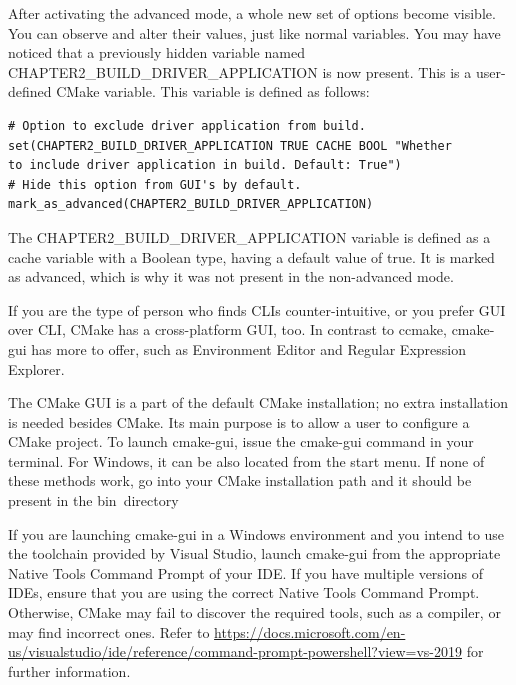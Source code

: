 After activating the advanced mode, a whole new set of options become visible. You can observe and alter their values, just like normal variables. You may have noticed that a previously hidden variable named CHAPTER2\_BUILD\_DRIVER\_APPLICATION is now present. This is a user-defined CMake variable. This variable is defined as follows:

\begin{lstlisting}[style=styleCMake]
# Option to exclude driver application from build.
set(CHAPTER2_BUILD_DRIVER_APPLICATION TRUE CACHE BOOL "Whether
to include driver application in build. Default: True")
# Hide this option from GUI's by default.
mark_as_advanced(CHAPTER2_BUILD_DRIVER_APPLICATION)
\end{lstlisting}

The CHAPTER2\_BUILD\_DRIVER\_APPLICATION variable is defined as a cache variable with a Boolean type, having a default value of true. It is marked as advanced, which is why it was not present in the non-advanced mode.


If you are the type of person who finds CLIs counter-intuitive, or you prefer GUI over CLI, CMake has a cross-platform GUI, too. In contrast to ccmake, cmake-gui has more to offer, such as Environment Editor and Regular Expression Explorer.

The CMake GUI is a part of the default CMake installation; no extra installation is needed besides CMake. Its main purpose is to allow a user to configure a CMake project. To launch cmake-gui, issue the cmake-gui command in your terminal. For Windows, it can be also located from the start menu. If none of these methods work, go into your CMake installation path and it should be present in the bin\ directory

\begin{tcolorbox}[colback=webgreen!5!white,colframe=webgreen!75!black,title=Note]
If you are launching cmake-gui in a Windows environment and you intend to use the toolchain provided by Visual Studio, launch cmake-gui from the appropriate Native Tools Command Prompt of your IDE. If you have multiple versions of IDEs, ensure that you are using the correct Native Tools Command Prompt. Otherwise, CMake may fail to discover the required tools, such as a compiler, or may find incorrect ones. Refer to \url{https://docs.microsoft.com/en-us/visualstudio/ide/reference/command-prompt-powershell?view=vs-2019} for further information.
\end{tcolorbox}

